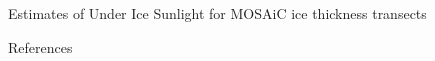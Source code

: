 \documentclass[final]{beamer}
\newlength{\sepwidth}
\newlength{\colwidth}
\newcommand{\separatorcolumn}{\begin{column}{\sepwidth}\end{column}}
\begin{document}
\begin{frame}[t,fragile]
\begin{columns}[t]
\begin{column}{\colwidth}
\begin{block}{Estimates of Under Ice Sunlight for MOSAiC ice thickness transects}
  \end{block}

  
  \begin{block}{References}

    \nocite{*}
    \footnotesize{}

  \end{block}

\end{column}
\separatorcolumn



\end{columns}
\end{frame}
\end{document}
